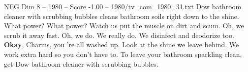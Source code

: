 \begin{textsample}{NEG Dim 8 – 1980 – Score -1.00 – 1980/tv\_com\_1980\_31.txt}  \label{ex:f8_neg_060}
Dow bathroom cleaner with scrubbing bubbles cleans bathroom soils right down to the shine.
What power?
What power?
Watch us put the muscle on dirt and scum.
Oh, we scrub it away fast.
Oh, we do.
We really do.
We disinfect and deodorize too. \textbf{Okay}, Charms, you 're all washed up.
Look at the shine we leave behind.
We work extra hard so you don't have to.
To leave your bathroom sparkling clean, get Dow bathroom cleaner with scrubbing bubbles.

\end{textsample}

